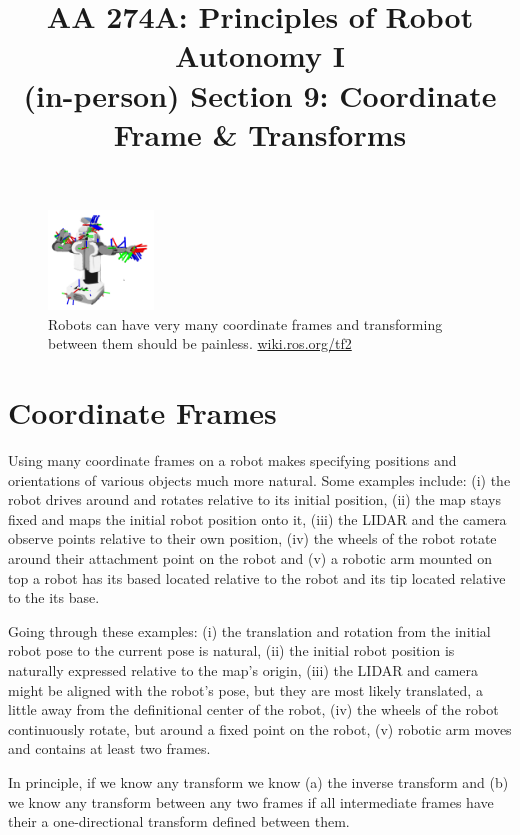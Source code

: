 \documentclass{article}
\title{AA 274A: Principles of Robot Autonomy I \\ (in-person) Section 9: Coordinate Frame \& Transforms}
\date{}
\begin{document}
\maketitle
\pagestyle{fancy}

\begin{figure}
\centering
\includegraphics[width=0.25\textwidth]{s9/figs/ros_tf_image.png}
\caption{Robots can have very many coordinate frames and transforming between them should be painless. \href{http://wiki.ros.org/tf2}{wiki.ros.org/tf2}}
\end{figure}

\section{Coordinate Frames}

Using many coordinate frames on a robot makes specifying positions and orientations of various objects much more natural. Some examples include: (i) the robot drives around and rotates relative to its initial position, (ii) the map stays fixed and maps the initial robot position onto it, (iii) the LIDAR and the camera observe points relative to their own position, (iv) the wheels of the robot rotate around their attachment point on the robot and (v) a robotic arm mounted on top a robot has its based located relative to the robot and its tip located relative to the its base.

Going through these examples: (i) the translation and rotation from the initial robot pose to the current pose is natural, (ii) the initial robot position is naturally expressed relative to the map's origin, (iii) the LIDAR and camera might be aligned with the robot's pose, but they are most likely translated, a little away from the definitional center of the robot, (iv) the wheels of the robot continuously rotate, but around a fixed point on the robot, (v) robotic arm moves and contains at least two frames.

In principle, if we know any transform we know (a) the inverse transform and (b) we know any transform between any two frames if all intermediate frames have their a one-directional transform defined between them.
\end{document}
